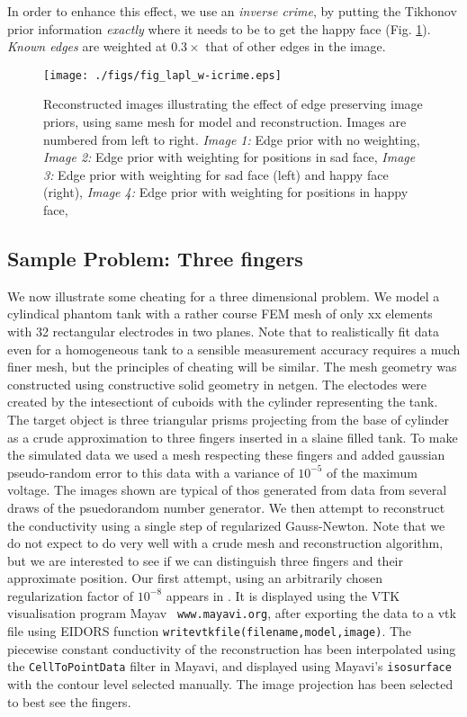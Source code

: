\documentclass[12pt]{iopart}
\begin{document}
In order to enhance this effect, we use an {\em inverse crime},
by putting the Tikhonov prior information {\em exactly} where
it needs to be to get the happy face
(Fig. \ref{fig:laplprior-icrime}).
{\em Known edges} are weighted at $0.3\times$ that of other
edges in the image.

%
%
\begin{figure}[th]
\begin{flushright}
\texttt{[image: ./figs/fig\_lapl\_w-icrime.eps]}
\caption{\small 
Reconstructed images illustrating the effect of edge
preserving image priors,
using same mesh for model and reconstruction.
Images are numbered from left to right.
{\em Image 1:} Edge prior with no weighting,
{\em Image 2:} Edge prior with weighting for positions in sad face,
{\em Image 3:} Edge prior with weighting for sad face (left) and
happy face (right),
{\em Image 4:} Edge prior with weighting for positions in happy face,
 }
 \label{fig:laplprior-icrime}
\end{flushright}
\end{figure}


\subsection{
Sample Problem: Three fingers
}
We now illustrate some cheating for a three dimensional
problem. We model a cylindical phantom tank with a rather
course FEM mesh of only xx elements with 32 rectangular
electrodes in two planes. Note that to realistically
fit data even for a homogeneous tank to a sensible
measurement accuracy requires a much finer mesh, but the
principles of cheating will be similar. The mesh geometry
was constructed using constructive solid geometry in
netgen. The electodes were created by the intesectiont
of cuboids with the cylinder representing the tank. The
target object is three triangular prisms projecting from
the base of cylinder as a crude approximation to three
fingers inserted in a slaine filled tank. To make the
simulated data we used a mesh respecting these fingers
 and added gaussian pseudo-random
error to this data with a variance of $10^{-5}$ of the maximum
voltage. The images shown are typical of thos generated
from data from several draws of the psuedorandom number
generator. We then attempt to reconstruct the conductivity
using a single step of regularized Gauss-Newton. Note that we do not expect to do
very well with a crude mesh and reconstruction algorithm,
but we are interested to see if we can distinguish three
fingers and their approximate position. Our first attempt,
using an arbitrarily chosen regularization factor
of $10^{-8}$ appears in . It is
displayed using the VTK visualisation program Mayav {\tt
www.mayavi.org}, after exporting the data to a vtk file
using EIDORS function {\tt writevtkfile(filename,model,image)}. The
piecewise constant conductivity of the reconstruction has
been interpolated using the {\tt CellToPointData} filter in
Mayavi, and displayed using Mayavi's {\tt isosurface} with
the contour level selected manually. The image projection
has been selected to best see the fingers.
\end{document}

